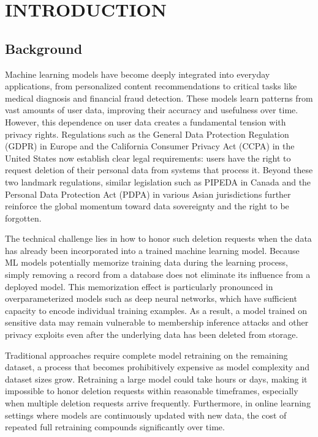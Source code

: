 \chapter{INTRODUCTION}

\section{Background}
Machine learning models have become deeply integrated into everyday applications, from personalized content recommendations to critical tasks like medical diagnosis and financial fraud detection. These models learn patterns from vast amounts of user data, improving their accuracy and usefulness over time. However, this dependence on user data creates a fundamental tension with privacy rights. Regulations such as the General Data Protection Regulation (GDPR) in Europe and the California Consumer Privacy Act (CCPA) in the United States now establish clear legal requirements: users have the right to request deletion of their personal data from systems that process it. Beyond these two landmark regulations, similar legislation such as PIPEDA in Canada and the Personal Data Protection Act (PDPA) in various Asian jurisdictions further reinforce the global momentum toward data sovereignty and the right to be forgotten.

The technical challenge lies in how to honor such deletion requests when the data has already been incorporated into a trained machine learning model. Because ML models potentially memorize training data during the learning process, simply removing a record from a database does not eliminate its influence from a deployed model. This memorization effect is particularly pronounced in overparameterized models such as deep neural networks, which have sufficient capacity to encode individual training examples. As a result, a model trained on sensitive data may remain vulnerable to membership inference attacks and other privacy exploits even after the underlying data has been deleted from storage.

Traditional approaches require complete model retraining on the remaining dataset, a process that becomes prohibitively expensive as model complexity and dataset sizes grow. Retraining a large model could take hours or days, making it impossible to honor deletion requests within reasonable timeframes, especially when multiple deletion requests arrive frequently. Furthermore, in online learning settings where models are continuously updated with new data, the cost of repeated full retraining compounds significantly over time.

